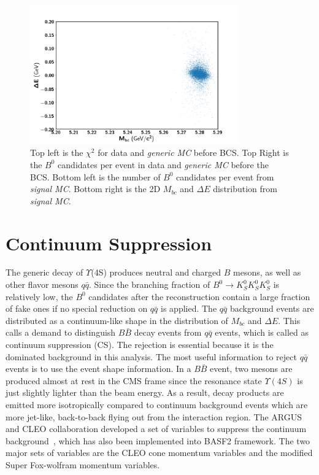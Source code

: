 \begin{figure}[htpb]
\begin{minipage}[b]{0.5\linewidth}
	\end{minipage}
	\begin{minipage}[b]{0.5\linewidth}
		\centering 
		\includegraphics[width=1\linewidth, height=6cm]{figures/hist_sig_MC_Mbc_dE}
		
	\end{minipage}
	
	\caption{Top left is the $\chi^2$ for data and \textit{generic MC} before BCS. Top Right is the $B^0$ candidates per event in data and \textit{generic MC} before the BCS. Bottom left is the number of $B^0$ candidates per event from \textit{signal MC}. Bottom right is the 2D $M_{bc}$ and $\Delta E$ distribution from \textit{signal MC}.}
	\label{fig:b0dist}
\end{figure}
\section{Continuum Suppression}
The generic decay of $\Upsilon$(4S) produces neutral and charged $B$ mesons, as well as other flavor mesons $q\bar{q}$. Since the branching fraction of $B^0 \to K_S^0  K_S^0  K_S^0$ is relatively low, the $B^0$ candidates after the reconstruction contain a large fraction of fake ones if no special reduction on $q\bar{q}$ is applied. 
The $q\bar{q}$ background events are distributed as a continuum-like shape in the distribution of $M_{bc}$ and $\Delta E$. This calls a demand to distinguish $B\bar{B}$ decay events from $q\bar{q}$ events, which is called as continuum suppression (CS). The rejection is essential because it is the dominated background in this analysis. The most useful information to reject $q\bar{q}$ events is to use the event shape information. In a $B\bar{B}$ event, two mesons are produced almost at rest in the CMS frame since the resonance state $\Upsilon(4S)$ is just slightly lighter than the beam energy. As a result, decay products are emitted more isotropically compared to continuum background events which are more jet-like, back-to-back flying out from the interaction region. The ARGUS and CLEO collaboration developed a set of variables to suppress the continuum background~\cite{Bevan_2014}, which has also been implemented into BASF2 framework. The two major sets of variables are the CLEO cone momentum variables and the modified Super Fox-wolfram momentum variables.

